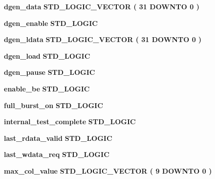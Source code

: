\begin{DoxyCompactItemize}
\item 
{\bf dgen\+\_\+data} {\bfseries \textcolor{comment}{S\+T\+D\+\_\+\+L\+O\+G\+I\+C\+\_\+\+V\+E\+C\+T\+OR}\textcolor{vhdlchar}{ }\textcolor{vhdlchar}{(}\textcolor{vhdlchar}{ }\textcolor{vhdlchar}{ } \textcolor{vhdldigit}{31} \textcolor{vhdlchar}{ }\textcolor{keywordflow}{D\+O\+W\+N\+TO}\textcolor{vhdlchar}{ }\textcolor{vhdlchar}{ } \textcolor{vhdldigit}{0} \textcolor{vhdlchar}{ }\textcolor{vhdlchar}{)}\textcolor{vhdlchar}{ }} 
\item 
{\bf dgen\+\_\+enable} {\bfseries \textcolor{comment}{S\+T\+D\+\_\+\+L\+O\+G\+IC}\textcolor{vhdlchar}{ }} 
\item 
{\bf dgen\+\_\+ldata} {\bfseries \textcolor{comment}{S\+T\+D\+\_\+\+L\+O\+G\+I\+C\+\_\+\+V\+E\+C\+T\+OR}\textcolor{vhdlchar}{ }\textcolor{vhdlchar}{(}\textcolor{vhdlchar}{ }\textcolor{vhdlchar}{ } \textcolor{vhdldigit}{31} \textcolor{vhdlchar}{ }\textcolor{keywordflow}{D\+O\+W\+N\+TO}\textcolor{vhdlchar}{ }\textcolor{vhdlchar}{ } \textcolor{vhdldigit}{0} \textcolor{vhdlchar}{ }\textcolor{vhdlchar}{)}\textcolor{vhdlchar}{ }} 
\item 
{\bf dgen\+\_\+load} {\bfseries \textcolor{comment}{S\+T\+D\+\_\+\+L\+O\+G\+IC}\textcolor{vhdlchar}{ }} 
\item 
{\bf dgen\+\_\+pause} {\bfseries \textcolor{comment}{S\+T\+D\+\_\+\+L\+O\+G\+IC}\textcolor{vhdlchar}{ }} 
\item 
{\bf enable\+\_\+be} {\bfseries \textcolor{comment}{S\+T\+D\+\_\+\+L\+O\+G\+IC}\textcolor{vhdlchar}{ }} 
\item 
{\bf full\+\_\+burst\+\_\+on} {\bfseries \textcolor{comment}{S\+T\+D\+\_\+\+L\+O\+G\+IC}\textcolor{vhdlchar}{ }} 
\item 
{\bf internal\+\_\+test\+\_\+complete} {\bfseries \textcolor{comment}{S\+T\+D\+\_\+\+L\+O\+G\+IC}\textcolor{vhdlchar}{ }} 
\item 
{\bf last\+\_\+rdata\+\_\+valid} {\bfseries \textcolor{comment}{S\+T\+D\+\_\+\+L\+O\+G\+IC}\textcolor{vhdlchar}{ }} 
\item 
{\bf last\+\_\+wdata\+\_\+req} {\bfseries \textcolor{comment}{S\+T\+D\+\_\+\+L\+O\+G\+IC}\textcolor{vhdlchar}{ }} 
\item 
{\bf max\+\_\+col\+\_\+value} {\bfseries \textcolor{comment}{S\+T\+D\+\_\+\+L\+O\+G\+I\+C\+\_\+\+V\+E\+C\+T\+OR}\textcolor{vhdlchar}{ }\textcolor{vhdlchar}{(}\textcolor{vhdlchar}{ }\textcolor{vhdlchar}{ } \textcolor{vhdldigit}{9} \textcolor{vhdlchar}{ }\textcolor{keywordflow}{D\+O\+W\+N\+TO}\textcolor{vhdlchar}{ }\textcolor{vhdlchar}{ } \textcolor{vhdldigit}{0} \textcolor{vhdlchar}{ }\textcolor{vhdlchar}{)}\textcolor{vhdlchar}{ }} 

\end{DoxyCompactItemize}

